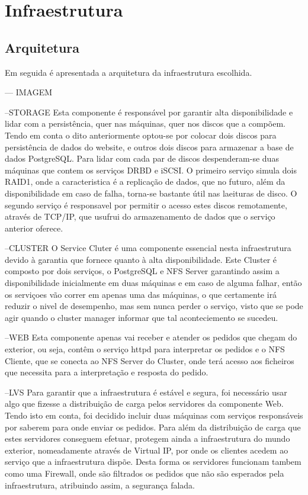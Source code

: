 \section{Infraestrutura}

\subsection{Arquitetura}

Em seguida é apresentada a arquitetura da infraestrutura escolhida.

--- IMAGEM

--STORAGE
Esta componente é responsável por garantir alta disponibilidade e lidar com a persistência, quer nas máquinas, quer nos discos que a compõem. Tendo em conta o dito anteriormente optou-se por colocar dois discos para persistência de dados do website, e outros dois discos para armazenar a base de dados PostgreSQL. Para lidar com cada par de discos despenderam-se duas máquinas que contem os serviços DRBD e iSCSI. O primeiro serviço simula dois RAID1, onde a caracteristica é a replicação de dados, que no futuro, além da disponibilidade em caso de falha, torna-se bastante útil nas laeituras de disco. O segundo serviço é responsavel por permitir o acesso estes discos remotamente, através de TCP/IP, que usufrui do armazenamento de dados que o serviço anterior oferece.

--CLUSTER
O Service Cluter é uma componente essencial nesta infraestrutura devido à garantia que fornece quanto à alta disponibilidade. Este Cluster é composto por dois serviços, o PostgreSQL e NFS Server garantindo assim a disponibilidade inicialmente em duas máquinas e em caso de alguma falhar, então os serviçoes vão correr em apenas uma das máquinas, o que certamente irá reduzir o nivel de desempenho, mas sem nunca perder o serviço, visto que se pode agir quando o cluster manager informar que tal aconteciemento se sucedeu.

--WEB
Esta componente apenas vai receber e atender os pedidos que chegam do exterior, ou seja, contêm o serviço httpd para interpretar os pedidos e o NFS Cliente, que se conecta ao NFS Server do Cluster, onde terá acesso aos ficheiros que necessita para a interpretação e resposta do pedido.

--LVS
Para garantir que a infraestrutura é estável e segura, foi necessário usar algo que fizesse a distribuição de carga pelos servidores da componente Web. Tendo isto em conta, foi decidido incluir duas máquinas com serviços responsáveis por saberem para onde enviar os pedidos. Para além da distribuição de carga que estes servidores conseguem efetuar, protegem ainda a infraestrutura do mundo exterior, nomeadamente através de Virtual IP, por onde os clientes acedem ao serviço que a infraestrutura dispõe. Desta forma os servidores funcionam tambem como uma Firewall, onde são filtrados os pedidos que não são esperados pela infraestrutura, atribuindo assim, a segurança falada.


